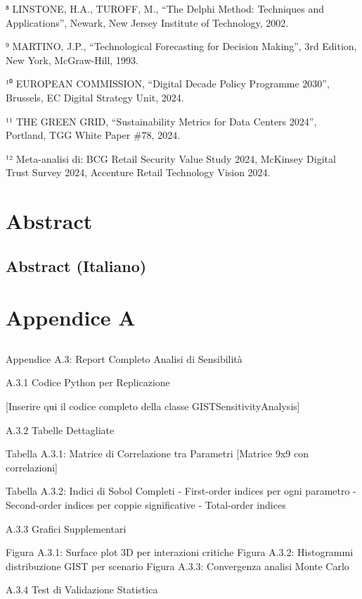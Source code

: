 \documentclass[12pt,a4paper,oneside]{book}
\numberwithin{figure}{chapter} %
\numberwithin{table}{chapter}  %
\begin{document}
⁸ LINSTONE, H.A., TUROFF, M., ``The Delphi Method: Techniques and
Applications'', Newark, New Jersey Institute of Technology, 2002.

⁹ MARTINO, J.P., ``Technological Forecasting for Decision Making'', 3rd
Edition, New York, McGraw-Hill, 1993.

¹⁰ EUROPEAN COMMISSION, ``Digital Decade Policy Programme 2030'',
Brussels, EC Digital Strategy Unit, 2024.

¹¹ THE GREEN GRID, ``Sustainability Metrics for Data Centers 2024'',
Portland, TGG White Paper \#78, 2024.

¹² Meta-analisi di: BCG Retail Security Value Study 2024, McKinsey
Digital Trust Survey 2024, Accenture Retail Technology Vision 2024.

\chapter{Abstract}\label{abstract-1}

\section{Abstract (Italiano)}\label{abstract-italiano}

\chapter{Appendice A}
\section{}
Appendice A.3: Report Completo Analisi di Sensibilità

A.3.1 Codice Python per Replicazione

[Inserire qui il codice completo della classe GISTSensitivityAnalysis]

A.3.2 Tabelle Dettagliate

Tabella A.3.1: Matrice di Correlazione tra Parametri
[Matrice 9x9 con correlazioni]

Tabella A.3.2: Indici di Sobol Completi
- First-order indices per ogni parametro
- Second-order indices per coppie significative
- Total-order indices

A.3.3 Grafici Supplementari

Figura A.3.1: Surface plot 3D per interazioni critiche
Figura A.3.2: Histogrammi distribuzione GIST per scenario
Figura A.3.3: Convergenza analisi Monte Carlo

A.3.4 Test di Validazione Statistica
\end{document}
